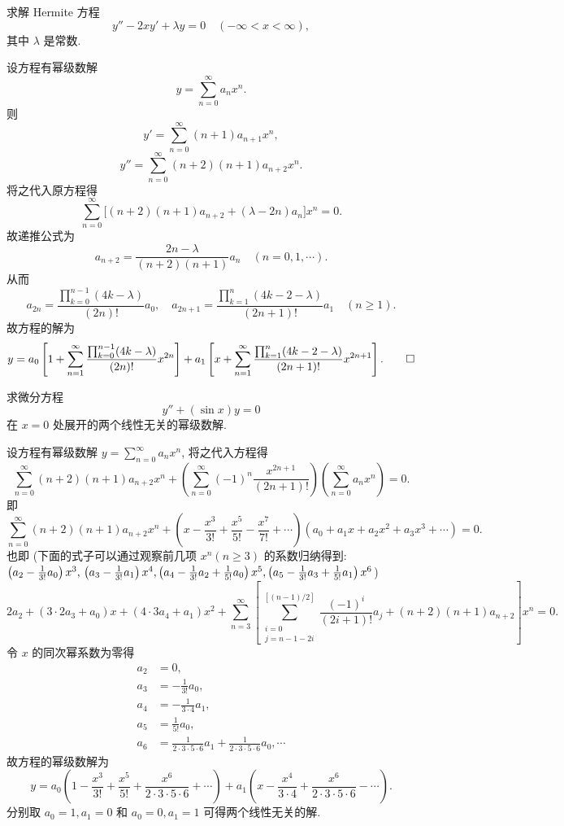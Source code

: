 \begin{exercise}
  求解 Hermite 方程
  \[y''-2xy'+\lambda y=0\quad (-\infty<x<\infty),\]
  其中 $\lambda$ 是常数.
\end{exercise}

\begin{solution} 
  设方程有幂级数解
  \[y = \sum_{n=0}^{\infty}a_nx^n.\]
  则
  \[y' = \sum_{n=0}^{\infty}(n+1)a_{n+1}x^n,\]
  \[y'' = \sum_{n=0}^{\infty}(n+2)(n+1)a_{n+2}x^n.\]
  将之代入原方程得
  \[\sum_{n=0}^{\infty} \big[(n+2)(n+1)a_{n+2}+(\lambda-2n)a_n\big]x^n = 0.\]
  故递推公式为
  \[a_{n+2} = \frac{2n-\lambda}{(n+2)(n+1)}a_n\quad (n=0,1,\cdots).\]
  从而
  \[a_{2n} = \frac{\prod_{k=0}^{n-1}(4k-\lambda)}{(2n)!}a_0,\quad
    a_{2n+1} = \frac{\prod_{k=1}^n(4k-2-\lambda)}{(2n+1)!}a_1\quad(n\geq1).\]
  故方程的解为
  \[y = a_0\left[1+\sum_{n=1}^{\infty}\frac{\prod_{k=0}^{n-1}(4k-\lambda)}{(2n)!}x^{2n}\right]
    + a_1\left[x+\sum_{n=1}^{\infty}\frac{\prod_{k=1}^n(4k-2-\lambda)}{(2n+1)!}x^{2n+1}\right].\qedhere\]
\end{solution}



\begin{exercise}
  求微分方程
  \[y'' + (\sin x) y = 0\]
  在 $x=0$ 处展开的两个线性无关的幂级数解.
\end{exercise}

\begin{solution}
  设方程有幂级数解 $y=\sum_{n=0}^{\infty}a_nx^n$, 将之代入方程得
  \[\sum_{n=0}^{\infty}(n+2)(n+1)a_{n+2}x^n
    + \left(\sum_{n=0}^{\infty}(-1)^n\frac{x^{2n+1}}{(2n+1)!}\right)
    \left(\sum_{n=0}^{\infty}a_nx^n\right)=0.\]
  即
  \[\sum_{n=0}^{\infty}(n+2)(n+1)a_{n+2}x^n
    + \left(x-\frac{x^3}{3!}+\frac{x^5}{5!}-\frac{x^7}{7!}
    + \cdots\right)\left(a_0+a_1x+a_2x^2+a_3x^3+\cdots\right)=0.\]
  也即 (下面的式子可以通过观察前几项 $x^n(n\geq3)$ 的系数归纳得到: 
  $\left(a_2-\frac{1}{3!}a_0\right)x^3,\\\left(a_3-\frac{1}{3!}a_1\right)x^4,\left(a_4-\frac{1}{3!}a_2+\frac{1}{5!}a_0\right)x^5,\left(a_5-\frac{1}{3!}a_3+\frac{1}{5!}a_1\right)x^6$)
  \[2a_2+(3\cdot2a_3+a_0)x+(4\cdot3a_4+a_1)x^2
    + \sum_{n=3}^{\infty}\left[\sum_{\substack{i=0\\j=n-1-2i}}^{[(n-1)/2]}\frac{(-1)^i}{(2i+1)!}a_j+(n+2)(n+1)a_{n+2}\right]x^n=0.\]
  令 $x$ 的同次幂系数为零得
  \begin{align*}
    a_2 & = 0, \\
    a_3 & = -\frac{1}{3!}a_0, \\
    a_4 & = -\frac{1}{3\cdot4}a_1, \\
    a_5 & = \frac{1}{5!}a_0, \\
    a_6 & = \frac{1}{2\cdot 3\cdot 5\cdot 6}a_1+\frac{1}{2\cdot 3\cdot 5\cdot 6}a_0,\cdots
  \end{align*}
  故方程的幂级数解为
  \[y=a_0\left(1-\frac{x^3}{3!}+\frac{x^5}{5!}+\frac{x^6}{2\cdot3\cdot5\cdot6}
    + \cdots\right)+a_1\left(x-\frac{x^4}{3\cdot4}+\frac{x^6}{2\cdot3\cdot5\cdot6}-\cdots\right).\]
  分别取 $a_0=1,a_1=0$ 和 $a_0=0,a_1=1$ 可得两个线性无关的解.
\end{solution}



